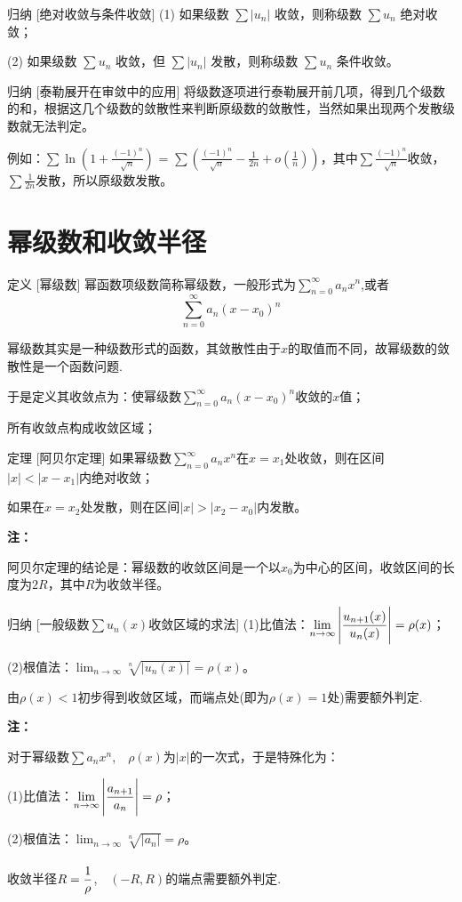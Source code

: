 \documentclass[a4paper,12pt,oneside,fontset=none]{ctexbook}
\let\olddfrac\dfrac
\renewcommand{\dfrac}[2]{
    \olddfrac{#1\vrule width 0pt height 1.15em depth 0em}{#2\vrule width 0pt height 0em depth 0.6em}
}
\let\oldlim\lim
\renewcommand{\lim}{\displaystyle\oldlim}
\let\oldsum\sum
\renewcommand{\sum}{\displaystyle\oldsum}
\newcounter{theorem}[chapter]
\newenvironment{theorem}[1][]{\begin{thmBox}{定理}{#1}}{\end{thmBox}}
\newenvironment{induction}[1][]{\begin{thmBox}{归纳}{#1}}{\end{thmBox}}
\newcounter{definition}[chapter]
\newenvironment{definition}[1][]{\begin{defBox}{定义}{#1}}{\end{defBox}}
\newenvironment{note}{
    \par\vspace{0.5em}\noindent
    \textbf{\color{NoteColor} 注：}
}{
    \par\vspace{0.5em}
}
\numberwithin{equation}{chapter}
\begin{document}
\begin{induction}
    [绝对收敛与条件收敛]
    (1) 如果级数 $\sum |u_n|$ 收敛，则称级数 $\sum u_n$ 绝对收敛；
    
    (2) 如果级数 $\sum u_n$ 收敛，但 $\sum |u_n|$ 发散，则称级数 $\sum u_n$ 条件收敛。
\end{induction}

\begin{induction}
    [泰勒展开在审敛中的应用]
    将级数逐项进行泰勒展开前几项，得到几个级数的和，根据这几个级数的敛散性来判断原级数的敛散性，当然如果出现两个发散级数就无法判定。
    
    例如：$\sum \ln(1+\frac{(-1)^n}{\sqrt{n}})$ = $\sum \left(\frac{(-1)^n}{\sqrt{n}} - \frac{1}{2n} + o(\frac{1}{n})\right)$，其中$\sum \frac{(-1)^n}{\sqrt{n}}$收敛，$\sum \frac{1}{2n}$发散，所以原级数发散。
\end{induction}

\section{幂级数和收敛半径}
\begin{definition}
    [幂级数]
    幂函数项级数简称幂级数，一般形式为$\sum_{n=0}^{\infty}a_n x^n$,或者$$\sum_{n=0}^{\infty}a_n (x-x_0)^n$$

    幂级数其实是一种级数形式的函数，其敛散性由于$x$的取值而不同，故幂级数的敛散性是一个函数问题.
    
    于是定义其收敛点为：使幂级数$\sum_{n=0}^{\infty}a_n (x-x_0)^n$收敛的$x$值；

    所有收敛点构成收敛区域；
\end{definition}

\begin{theorem}
    [阿贝尔定理]
    如果幂级数$\sum_{n=0}^{\infty}a_n x^n$在$x=x_1$处收敛，则在区间$|x|<|x-x_1|$内绝对收敛；
    
    如果在$x=x_2$处发散，则在区间$|x|>|x_2-x_0|$内发散。
\end{theorem}
\begin{note}
    阿贝尔定理的结论是：幂级数的收敛区间是一个以$x_0$为中心的区间，收敛区间的长度为$2R$，其中$R$为收敛半径。
\end{note}


\begin{induction}
    [一般级数$\sum u_n(x)$收敛区域的求法]
    (1)比值法：$\lim_{n \to \infty} \left|\dfrac{u_{n+1}(x)}{u_n(x)}\right| = \rho(x)$；
    
    (2)根值法：$\lim_{n \to \infty} \sqrt[n]{|u_n(x)|} = \rho(x)$。

    由$\rho(x)<1$初步得到收敛区域，而端点处(即为$\rho(x)=1$处)需要额外判定.
\end{induction}
\begin{note}
    对于幂级数$\sum a_n x^n$,$\quad \rho(x)$为$|x|$的一次式，于是特殊化为：
    
    (1)比值法：$\lim_{n \to \infty} \left|\dfrac{a_{n+1}}{a_n}\right| = \rho$；
    
    (2)根值法：$\lim_{n \to \infty} \sqrt[n]{|a_n|} = \rho$。

    收敛半径$R = \dfrac{1}{\rho}$,$\quad(-R, R)$的端点需要额外判定.
\end{note}
\end{document}
